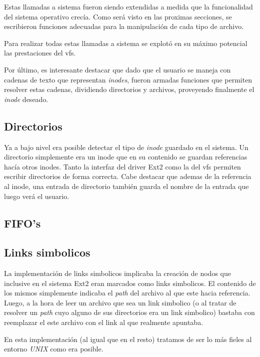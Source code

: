 \documentclass[a4paper,10pt]{article}
\begin{document}
    Estas llamadas a sistema fueron siendo extendidas a medida que la funcionalidad del sistema operativo crecía. Como
    será visto en las proximas secciones, se escribieron funciones adecuadas para la manipulación de cada tipo de archivo.
    
    Para realizar todas estas llamadas a sistema se explotó en su máximo potencial las prestaciones del vfs.
    
    Por último, es interesante destacar que dado que el usuario se maneja con cadenas de texto que representan 
    \textit{inodes}, fueron armadas funciones que permiten resolver estas cadenas, dividiendo directorios y archivos,
    proveyendo finalmente el \textit{inode} deseado. 

    \subsection{Directorios}
    
    Ya a bajo nivel era posible detectar el tipo de \textit{inode} guardado en el sistema. Un directorio simplemente era
    un inode que en su contenido se guardan referencias hacía otros inodes. Tanto la interfaz del driver Ext2 como la del
    vfs permiten escribir directorios de forma correcta. Cabe destacar que ademas de la referencia al inode, una entrada
    de directorio también guarda el nombre de la entrada que luego verá el usuario.

    \subsection{FIFO's}

    \subsection{Links simbolicos}
    
    La implementación de links simbolicos implicaba la creación de nodos que inclusive en el sistema Ext2 eran marcados
    como links simbolicos. El contenido de los mismos simplemente indicaba el \textit{path} del archivo al que este
    hacia referencia.
    Luego, a la hora de leer un archivo que sea un link simbolico (o al tratar de resolver un \textit{path} cuyo alguno
    de sus directorios era un link simbolico) bastaba con reemplazar el este archivo con el link al que realmente
    apuntaba.

    En esta implementación (al igual que en el resto) tratamos de ser lo más fieles al entorno \textit{UNIX} como 
    era posible.
\end{document}
